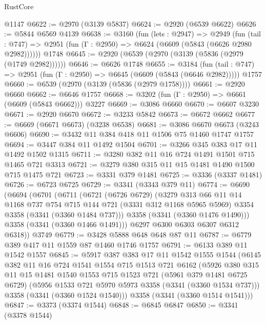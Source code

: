 \begin{lexlean}{RustCore}
\begin{coremodule}
    @1147
@6622 := @2970 (@3139 @5837)
@6624 := @2920 (@6539 @6622)
@6626 := @5844 @6569 @4139
@6638 := @3160
    (fun (lets : @2947) =>
    @2949
      (fun (tail : @747) => @2951 (fun (Γ : @2950) => @6624 (@6609 (@5843 (@6626 @2980 @2982))))))
    @1748
@6645 := @2920 (@6539 (@2970 (@3139 (@5836 (@2979 (@1749 @2982))))))
@6646 := @6626 @1748
@6655 := @3184
    (fun (tail : @747) => @2951 (fun (Γ : @2950) => @6645 (@6609 (@5843 (@6646 @2982)))))
    @1757
@6660 := @6539 (@2970 (@3139 (@5836 (@2979 @1758))))
@6661 := @2920 @6660
@6662 := @6646 @1757
@6668 := @3202 (fun (Γ : @2950) => @6661 (@6609 (@5843 @6662))) @3227
@6669 := @3086 @6660
@6670 := @6607 @3230
@6671 := @2920 @6670
@6672 := @3233 @5842
@6673 := @6672 @6662
@6677 := @6669 (@6671 @6673) (@3238 @6538)
@6681 := @3086 @6670 @6673 (@3243 @6606)
@6690 := @3432 @11 @384 @418 @11 @1506 @75 @1460 @1747 @1757
@6694 := @3447 @384 @11 @1492 @1504
@6701 := @3266 @345 @383 @17 @11 @1492 @1502 @1315
@6711 := @3280 @382 @11 @16 @724 @1491 @1501 @715 @1465 @721 @3313
@6721 := @3279 @380 @315 @11 @15 @1481 @1490 @1500 @715 @1475 @721
@6723 := @3331 @379 @1481
@6725 := @3336 (@3337 @1481)
@6726 := @6723 @6725
@6729 := @3341 (@3343 @379 @11)
@6774 := @6690
    (@6694
      (@6701
        (@6711
          (@6721
            (@6726 @6729)
            (@3279
              @313
              @66
              @11
              @14
              @1168
              @737
              @754
              @715
              @144
              @721
              (@3331 @312 @1168 @5965 @5969)
              @3354
              @3358
              (@3341 (@3360 @1484 @737)))
            @3358
            (@3341 (@3360 @1476 @1490)))
          @3358
          (@3341 (@3360 @1466 @1491)))
        @6297
        @6300
        @6303
        @6307
        @6312
        @6318))
    @3749
@6779 := @3428 @5888 @648 @648 @87 @11
@6787 := @6779 @389 @417 @11 @1559 @87 @1460 @1746 @1757
@6791 := @6133 @389 @11 @1542 @1557
@6845 := @5917
    @387
    @383
    @17
    @11
    @1542
    @1555
    @1544
    (@6145
      @382
      @11
      @16
      @724
      @1541
      @1554
      @715
      @1513
      @721
      @6162
      (@5926
        @380
        @315
        @11
        @15
        @1481
        @1540
        @1553
        @715
        @1523
        @721
        (@5961 @379 @1481 @6725 @6729)
        (@5956 @1533 @721 @5970 @5973 @3358 (@3341 (@3360 @1534 @737)))
        @3358
        (@3341 (@3360 @1524 @1540)))
      @3358
      (@3341 (@3360 @1514 @1541)))
@6847 := @3373 (@3374 @1544)
@6848 := @6845 @6847
@6850 := @3341 (@3378 @1544)

\end{coremodule}
\end{lexlean}
